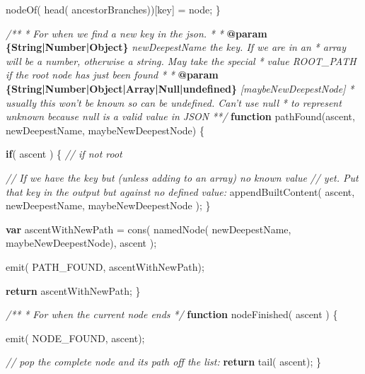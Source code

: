 \documentclass[12pt, ]{article}
\newenvironment{Shaded}{}{}
\newcommand{\KeywordTok}[1]{\textcolor[rgb]{0.00,0.44,0.13}{\textbf{{#1}}}}
\newcommand{\CommentTok}[1]{\textcolor[rgb]{0.38,0.63,0.69}{\textit{{#1}}}}
\newcommand{\FunctionTok}[1]{\textcolor[rgb]{0.02,0.16,0.49}{{#1}}}
\newcommand{\NormalTok}[1]{{#1}}
\begin{document}
\begin{Shaded}
\begin{Highlighting}[]
      \FunctionTok{nodeOf}\NormalTok{( }\FunctionTok{head}\NormalTok{( ancestorBranches))[key] = node;}
   \NormalTok{\}}

     
   \CommentTok{/**}
\CommentTok{    * For when we find a new key in the json.}
\CommentTok{    * }
\CommentTok{    * }\KeywordTok{@param}\CommentTok{ }\KeywordTok{\{String|Number|Object\}}\CommentTok{ newDeepestName the key. If we are in an }
\CommentTok{    *    array will be a number, otherwise a string. May take the special }
\CommentTok{    *    value ROOT_PATH if the root node has just been found}
\CommentTok{    *    }
\CommentTok{    * }\KeywordTok{@param}\CommentTok{ }\KeywordTok{\{String|Number|Object|Array|Null|undefined\}}\CommentTok{ [maybeNewDeepestNode] }
\CommentTok{    *    usually this won't be known so can be undefined. Can't use null }
\CommentTok{    *    to represent unknown because null is a valid value in JSON}
\CommentTok{    **/}  
   \KeywordTok{function} \FunctionTok{pathFound}\NormalTok{(ascent, newDeepestName, maybeNewDeepestNode) \{}

      \KeywordTok{if}\NormalTok{( ascent ) \{ }\CommentTok{// if not root}
      
         \CommentTok{// If we have the key but (unless adding to an array) no known value}
         \CommentTok{// yet. Put that key in the output but against no defined value:      }
         \FunctionTok{appendBuiltContent}\NormalTok{( ascent, newDeepestName, maybeNewDeepestNode );}
      \NormalTok{\}}
   
      \KeywordTok{var} \NormalTok{ascentWithNewPath = }\FunctionTok{cons}\NormalTok{( }
                                 \FunctionTok{namedNode}\NormalTok{( newDeepestName, }
                                            \NormalTok{maybeNewDeepestNode), }
                                 \NormalTok{ascent}
                              \NormalTok{);}
     
      \FunctionTok{emit}\NormalTok{( PATH_FOUND, ascentWithNewPath);}
 
      \KeywordTok{return} \NormalTok{ascentWithNewPath;}
   \NormalTok{\}}


   \CommentTok{/**}
\CommentTok{    * For when the current node ends}
\CommentTok{    */}
   \KeywordTok{function} \FunctionTok{nodeFinished}\NormalTok{( ascent ) \{}

      \FunctionTok{emit}\NormalTok{( NODE_FOUND, ascent);}
                          
      \CommentTok{// pop the complete node and its path off the list:                                    }
      \KeywordTok{return} \FunctionTok{tail}\NormalTok{( ascent);}
   \NormalTok{\}      }
                 

\end{Highlighting}
\end{Shaded}
\end{document}
